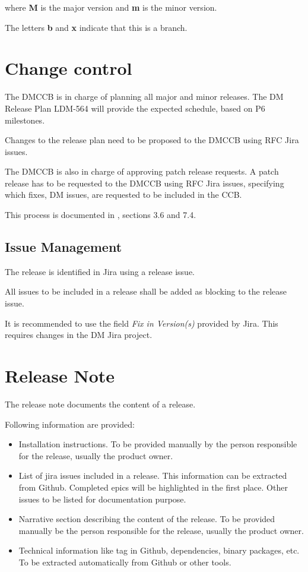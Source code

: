 where {\bf M} is the major version and {\bf m} is the minor version.

The letters {\bf b} and {\bf x} indicate that this is a branch.

\newpage
\section{Change control} \label{sec:changecontrol}

The DMCCB is in charge of planning all major and minor releases.
The DM Release Plan LDM-564 will provide the expected schedule, based on P6 milestones.

Changes to the release plan need to be proposed to the DMCCB using RFC Jira issues.

The DMCCB is also in charge of approving patch release requests.
A patch release has to be requested to the DMCCB using RFC Jira issues, specifying which fixes, DM issues, are requested to be included in the CCB.

This process is documented in , sections 3.6 and 7.4.


\subsection{Issue Management} \label{sec:issues}

The release is identified in Jira using a release issue.

All issues to be included in a release shall be added as blocking to the release issue.

It is recommended to use the field \textit{Fix in Version(s)} provided by Jira.
This requires changes in the DM Jira project.


\newpage
\section{Release Note} \label{sec:relnote}

The release note documents the content of a release.

Following information are provided:
\begin{itemize}
\item Installation instructions. To be provided manually by the person responsible for the release, usually the product owner.
\item List of jira issues included in a release. This information can be extracted from Github. Completed epics will be highlighted in the first place. Other issues to be listed for documentation purpose.
\item Narrative section describing the content of the release. To be provided manually be the person responsible for the release, usually the product owner.
\item Technical information like tag in Github, dependencies, binary packages, etc. To be extracted automatically from Github or other tools.
\end{itemize}

